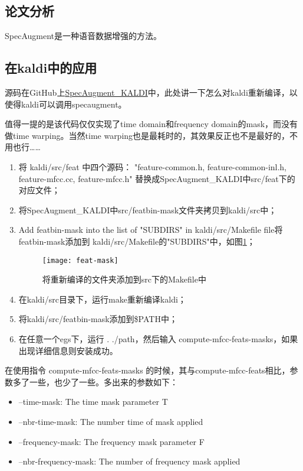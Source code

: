 \subsection{论文分析}
SpecAugment\cite{Park2019}是一种语音数据增强的方法。

\subsection{在kaldi中的应用}
源码在GitHub上\href{https://github.com/irebai/SpecAugment\_KALDI.git}{SpecAugment_KALDI}中，此处讲一下怎么对kaldi重新编译，以使得kaldi可以调用specaugment。

值得一提的是该代码仅仅实现了time domain和frequency domain的mask，而没有做time warping。当然time warping也是最耗时的，其效果反正也不是最好的，不用也行……

\begin{enumerate}
  \item 将 kaldi/src/feat 中四个源码： "feature-common.h, feature-common-inl.h, feature-mfcc.cc, feature-mfcc.h" 替换成SpecAugment\_KALDI中src/feat下的对应文件；
  \item 将SpecAugment\_KALDI中src/featbin-mask文件夹拷贝到kaldi/src中；
  \item Add featbin-mask into the list of "SUBDIRS" in kaldi/src/Makefile file将featbin-mask添加到 kaldi/src/Makefile的"SUBDIRS"中，如图\ref{fig:feat-mask}；
  \begin{figure}[h]
  \centering
  \texttt{[image: feat-mask]}
  \caption{将重新编译的文件夹添加到src下的Makefile中 \label{fig:feat-mask}}
  \end{figure}
  \item 在kaldi/src目录下，运行make重新编译kaldi；
  \item 将kaldi/src/featbin-mask添加到\$PATH中；
  \item 在任意一个egs下，运行 . ./path，然后输入 compute-mfcc-feats-masks，如果出现详细信息则安装成功。
\end{enumerate}

在使用指令 compute-mfcc-feats-masks 的时候，其与compute-mfcc-feats相比，参数多了一些，也少了一些。多出来的参数如下：
\begin{itemize}
  \item --time-mask: The time mask parameter T
  \item --nbr-time-mask: The number time of mask applied
  \item --frequency-mask: The frequency mask parameter F
  \item --nbr-frequency-mask: The number of frequency mask applied
\end{itemize}

